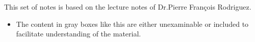\thispagestyle{empty}
This set of notes is based on the lecture notes of Dr.Pierre François Rodriguez.  

\begin{unexaminable}
\begin{itemize}
    \item The content in gray boxes like this are either unexaminable or included to facilitate understanding of the material.
\end{itemize}
\end{unexaminable}  

